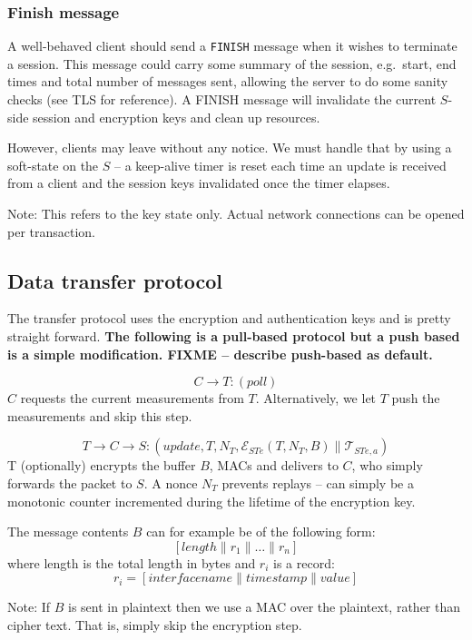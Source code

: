 \subsubsection{Finish message}

A well-behaved client should send a \texttt{FINISH} message when it wishes to terminate a session. This message could carry some summary of the session, e.g.\ start, end times and total number of messages sent, allowing the server to do some sanity checks (see TLS for reference). A FINISH message will invalidate the current $S$-side session and encryption keys and clean up resources. 

However, clients may leave without any notice. We must handle that by using a soft-state on the $S$ -- a keep-alive timer is reset each time an update is received from a client and the session keys invalidated once the timer elapses.

Note: This refers to the key state only. Actual network connections can be opened per transaction.

\subsection{Data transfer protocol}

The transfer protocol uses the encryption and authentication keys and is pretty straight forward. \textbf{The following is a pull-based protocol but a push based is a simple modification. FIXME -- describe push-based as default.}

\[
C \rightarrow T: (\textit{poll})
\]
$C$ requests the current measurements from $T$. Alternatively, we let $T$ push the measurements and skip this step.

\[
T \rightarrow C \rightarrow S: (\textit{update},T,N_T,\mathcal{E}_{STe}(T,N_T,B) \parallel \mathcal{T}_{STe,a})
\]
T (optionally) encrypts the buffer $B$, MACs and delivers to $C$, who simply forwards the packet to $S$. A nonce $N_T$ prevents replays -- can simply be a monotonic counter incremented during the lifetime of the encryption key.

The message contents $B$ can for example be of the following form:
\[
[length \parallel r_1 \parallel \dots \parallel r_n ]
\]
where length is the total length in bytes and $r_i$ is a record:
\[
r_i = [interface name \parallel timestamp \parallel value ]
\]

Note: If $B$ is sent in plaintext then we use a MAC over the plaintext, rather than cipher text. That is, simply skip the encryption step.

